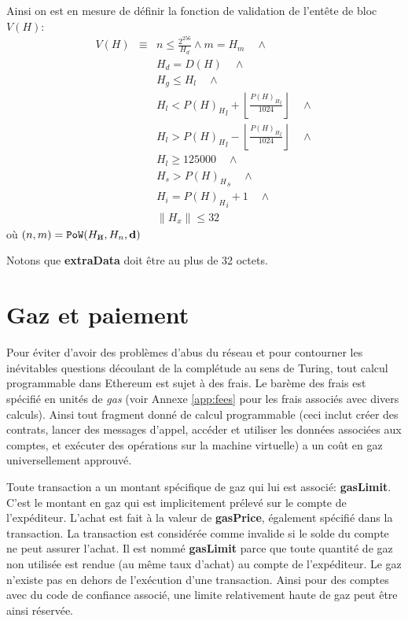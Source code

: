 \documentclass[9pt,oneside]{amsart}
\newcommand{\hcancel}[1]{%
    \tikz[baseline=(tocancel.base)]{
        \node[inner sep=0pt,outer sep=0pt] (tocancel) {#1};
        \draw[black] (tocancel.south west) -- (tocancel.north east);
    }%
}%
\begin{document}
\begin{multicols}{2}
Ainsi on est en mesure de définir la fonction de validation de l'entête de bloc $V(H)$:
\begin{eqnarray}
V(H) & \equiv &  n \leqslant \frac{2^{256}}{H_d} \wedge m = H_m \quad \wedge \\
& & H_d = D(H) \quad \wedge \\
& & H_g \le H_l  \quad \wedge \\
& & H_l < {P(H)_H}_l + \left\lfloor\frac{{P(H)_H}_l}{1024}\right\rfloor  \quad \wedge \\
& & H_l > {P(H)_H}_l - \left\lfloor\frac{{P(H)_H}_l}{1024}\right\rfloor  \quad \wedge \\
& & H_l \geqslant 125000  \quad \wedge \\
& & H_s > {P(H)_H}_s \quad \wedge \\
& & H_i = {P(H)_H}_i +1 \quad \wedge \\
& & \lVert H_x \rVert \le 32
\end{eqnarray}
où $(n, m) = \mathtt{PoW}(H_{\hcancel{n}}, H_n, \mathbf{d})$

Notons que \textbf{extraData} doit être au plus de 32 octets.

\section{Gaz et paiement} \label{ch:payment}

Pour éviter d'avoir des problèmes d'abus du réseau et pour contourner les inévitables questions découlant de la complétude au sens de Turing, tout calcul programmable dans Ethereum est sujet à des frais. Le barème des frais est spécifié en unités de \textit{gas} (voir Annexe \ref{app:fees} pour les frais associés avec divers calculs). Ainsi tout fragment donné de calcul programmable (ceci inclut créer des contrats, lancer des messages d'appel, accéder et utiliser les données associées aux comptes, et exécuter des opérations sur la machine virtuelle) a un coût en gaz universellement approuvé.

Toute transaction a un montant spécifique de gaz qui lui est associé: \textbf{gasLimit}. C'est le montant en gaz qui est implicitement prélevé sur le compte de l'expéditeur. L'achat est fait à la valeur de \textbf{gasPrice}, également spécifié dans la transaction. La transaction est considérée comme invalide si le solde du compte ne peut assurer l'achat. Il est nommé \textbf{gasLimit} parce que toute quantité de gaz non utilisée est rendue (au même taux d'achat) au compte de l'expéditeur. Le gaz n'existe pas en dehors de l'exécution d'une transaction. Ainsi pour des comptes avec du code de confiance associé, une limite relativement haute de gaz peut être ainsi réservée.


\end{multicols}
\end{document}
